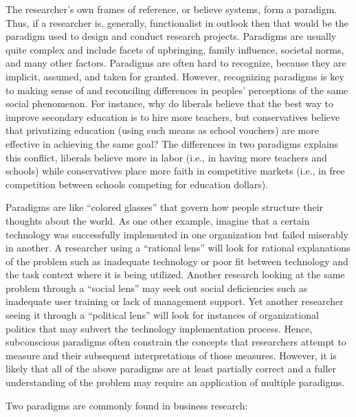 The researcher's own frames of reference, or believe systems, form a paradigm. Thus, if a researcher is, generally, functionalist in outlook then that would be the paradigm used to design and conduct research projects. Paradigms are usually quite complex and include facets of upbringing, family influence, societal norms, and many other factors. Paradigms are often hard to recognize, because they are implicit, assumed, and taken for granted. However, recognizing paradigms is key to making sense of and reconciling differences in peoples' perceptions of the same social phenomenon. For instance, why do liberals believe that the best way to improve secondary education is to hire more teachers, but conservatives believe that privatizing education (using such means as school vouchers) are more effective in achieving the same goal? The differences in two paradigms explains this conflict, liberals believe more in labor (i.e., in having more teachers and schools) while conservatives place more faith in competitive markets (i.e., in free competition between schools competing for education dollars). 

Paradigms are like ``colored glasses'' that govern how people structure their thoughts about the world. As one other example, imagine that a certain technology was successfully implemented in one organization but failed miserably in another. A researcher using a ``rational lens'' will look for rational explanations of the problem such as inadequate technology or poor fit between technology and the task context where it is being utilized. Another research looking at the same problem through a ``social lens'' may seek out social deficiencies such as inadequate user training or lack of management support. Yet another researcher seeing it through a ``political lens'' will look for instances of organizational politics that may subvert the technology implementation process. Hence, subconscious paradigms often constrain the concepts that researchers attempt to measure and their subsequent interpretations of those measures. However, it is likely that all of the above paradigms are at least partially correct and a fuller understanding of the problem may require an application of multiple paradigms.

Two paradigms are commonly found in business research:

